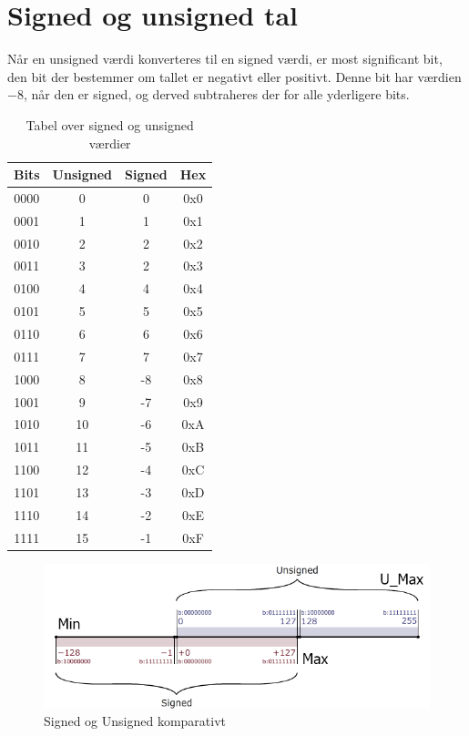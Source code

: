 \section{Signed og unsigned tal}
Når en unsigned værdi konverteres til en signed værdi, er most significant bit, den bit der bestemmer om tallet er negativt eller positivt.
Denne bit har værdien $-8$, når den er signed, og derved subtraheres der for alle yderligere bits.
\begin{table}[h]
    \centering
    \begin{tabular}{c|c|c|c}
        Bits&Unsigned&Signed&Hex\\\hline
        0000&0&0&0x0\\
        0001&1&1&0x1\\
        0010&2&2&0x2\\
        0011&3&2&0x3\\
        0100&4&4&0x4\\
        0101&5&5&0x5\\
        0110&6&6&0x6\\
        0111&7&7&0x7\\
        1000&8&-8&0x8\\
        1001&9&-7&0x9\\
        1010&10&-6&0xA\\
        1011&11&-5&0xB\\
        1100&12&-4&0xC\\
        1101&13&-3&0xD\\
        1110&14&-2&0xE\\
        1111&15&-1&0xF\\
    \end{tabular}
    \caption{Tabel over signed og unsigned værdier}
\end{table}
\begin{figure}[h!]
    \centering
    \includegraphics[width=\textwidth]{figures/signed.png}
    \caption{Signed og Unsigned komparativt}
    \label{fig:signed}
\end{figure}
